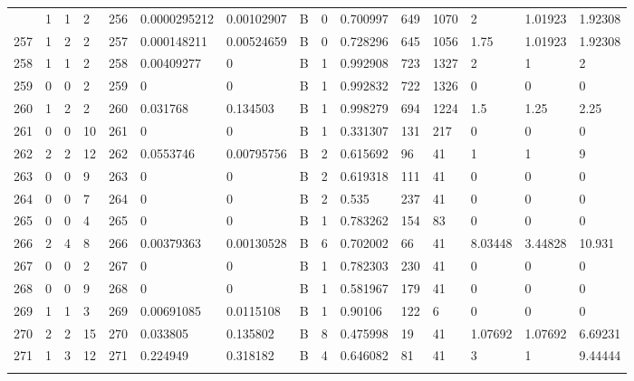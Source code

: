\begin{latin}
\begin{longtable}{lllllllllllllll}
\begin{comment}
	256 & 1  & 1   & 2  & 256 & 0.0000295212   & 0.00102907     & B & 0  & 0.700997 & 649  & 1070 & 2       & 1.01923 & 1.92308 \\
	257 & 1  & 2   & 2  & 257 & 0.000148211    & 0.00524659     & B & 0  & 0.728296 & 645  & 1056 & 1.75    & 1.01923 & 1.92308 \\
	258 & 1  & 1   & 2  & 258 & 0.00409277     & 0              & B & 1  & 0.992908 & 723  & 1327 & 2       & 1       & 2       \\
	259 & 0  & 0   & 2  & 259 & 0              & 0              & B & 1  & 0.992832 & 722  & 1326 & 0       & 0       & 0       \\
	260 & 1  & 2   & 2  & 260 & 0.031768       & 0.134503       & B & 1  & 0.998279 & 694  & 1224 & 1.5     & 1.25    & 2.25    \\
	261 & 0  & 0   & 10 & 261 & 0              & 0              & B & 1  & 0.331307 & 131  & 217  & 0       & 0       & 0       \\
	262 & 2  & 2   & 12 & 262 & 0.0553746      & 0.00795756     & B & 2  & 0.615692 & 96   & 41   & 1       & 1       & 9       \\
	263 & 0  & 0   & 9  & 263 & 0              & 0              & B & 2  & 0.619318 & 111  & 41   & 0       & 0       & 0       \\
	264 & 0  & 0   & 7  & 264 & 0              & 0              & B & 2  & 0.535    & 237  & 41   & 0       & 0       & 0       \\
	265 & 0  & 0   & 4  & 265 & 0              & 0              & B & 1  & 0.783262 & 154  & 83   & 0       & 0       & 0       \\
	266 & 2  & 4   & 8  & 266 & 0.00379363     & 0.00130528     & B & 6  & 0.702002 & 66   & 41   & 8.03448 & 3.44828 & 10.931  \\
	267 & 0  & 0   & 2  & 267 & 0              & 0              & B & 1  & 0.782303 & 230  & 41   & 0       & 0       & 0       \\
	268 & 0  & 0   & 9  & 268 & 0              & 0              & B & 1  & 0.581967 & 179  & 41   & 0       & 0       & 0       \\
	269 & 1  & 1   & 3  & 269 & 0.00691085     & 0.0115108      & B & 1  & 0.90106  & 122  & 6    & 0       & 0       & 0       \\
	270 & 2  & 2   & 15 & 270 & 0.033805       & 0.135802       & B & 8  & 0.475998 & 19   & 41   & 1.07692 & 1.07692 & 6.69231 \\
	271 & 1  & 3   & 12 & 271 & 0.224949       & 0.318182       & B & 4  & 0.646082 & 81   & 41   & 3       & 1       & 9.44444 \\

\end{comment}
\end{longtable}
\end{latin}
